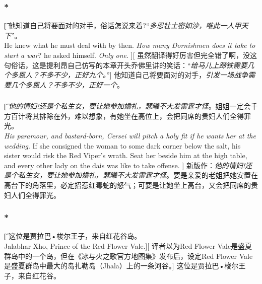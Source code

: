 \documentclass[12pt,a4paper]{article}
\begin{document}
\subsubsection{\color{red}*}\label{3.38.3}\t[
	他知道自己将要面对的对手，俗话怎说来着?“\emph{多恩壮士密如沙，唯此一人甲天下}”。\\
	He knew what he must deal with by then. \emph{How many Dornishmen does it take to start a war}? he asked himself. \emph{Only one}. ][
	虽然翻译得好厉害但完全错了啊，没这句俗话，这是提利昂自己仿写的本章开头乔佛里讲的笑话：“\emph{给马儿上蹄铁需要几个多恩人？不多不少，正好九个。}”]
	他知道自己将要面对的对手，\emph{引发一场战争需要几个多恩人？不多不少，正好一个}。
	
\subsubsection{}\t[
	\emph{他的情妇!还是个私生女，要让她参加婚礼，瑟曦不大发雷霆才怪}。姐姐一定会千方百计将其排除在外，难以想象，有她坐在高位上，会把同席的贵妇人们全得罪光。\\
	\emph{His paramour, and bastard-born, Cersei will pitch a holy fit if he wants her at the wedding}. If she consigned the woman to some dark corner below the salt, his sister would risk the Red Viper's wrath. Seat her beside him at the high table, and every other lady on the dais was like to take offense. ]
	新版作：\emph{他的情妇!还是个私生女，要让她参加婚礼，瑟曦不大发雷霆才怪}。要是亲爱的老姐把她安置在高台下的角落里，必定招惹红毒蛇的怒气；可要是让她坐上高台，又会把同席的贵妇人们全得罪光。
\subsubsection{\color{red}*}\t[
	这位是贾拉巴•梭尔王子，来自红花谷岛。\\
	Jalabhar Xho, Prince of the Red Flower Vale.][
	译者以为Red Flower Vale是盛夏群岛中的一个岛，但在《冰与火之歌官方地图集》发布后，设定Red Flower Vale是盛夏群岛中最大的岛扎勒岛（Jhala）上的一条河谷。]
	这位是贾拉巴•梭尔王子，来自红花谷。
	
\end{document}
